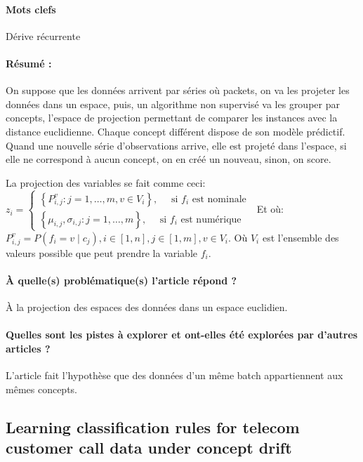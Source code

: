 \documentclass[11pt,a4paper]{report}
\begin{document}
\paragraph{Mots clefs} Dérive récurrente

\paragraph{Résumé :} On suppose que les données arrivent par séries où packets, on va les projeter les données dans un espace, puis, un algorithme non supervisé va les grouper par concepts, l'espace de projection permettant de comparer les instances avec la distance euclidienne. Chaque concept différent dispose de son modèle prédictif. Quand une nouvelle série d'observations arrive, elle est projeté dans l'espace, si elle ne correspond à aucun concept, on en créé un nouveau, sinon, on score.

La projection des variables se fait comme ceci: $z_{i}=\left\{\begin{array}{l}
\left\{P_{i, j}^{v}: j=1, \ldots, m, v \in V_{i}\right\}, \quad \text { si } f_{i} \text { est nominale } \\
\left\{\mu_{i, j}, \sigma_{i, j}: j=1, \ldots, m\right\}, \quad \text { si } f_{i} \text { est numérique }
\end{array}\right.$
Et où:
$P_{i, j}^{v}=P\left(f_{i}=v \mid c_{j}\right), i \in[1, n], j \in[1, m], v \in V_{i}$. Où $V_{i}$ est l'ensemble des valeurs possible que peut prendre la variable $f_{i}$.
\paragraph{À quelle(s) problématique(s) l'article répond ?} À la projection des espaces des données dans un espace euclidien.

\paragraph{Quelles sont les pistes à explorer et ont-elles  été explorées par d'autres articles ?} L'article fait l'hypothèse que des données d'un même batch appartiennent aux mêmes concepts.







\subsection{Learning classification rules for telecom  customer call data under concept drift}
\end{document}
